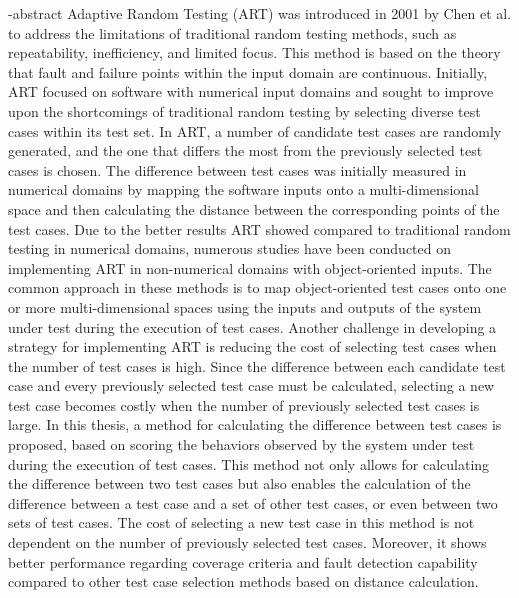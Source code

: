 
\en-abstract{
Adaptive Random Testing (ART) was introduced in 2001 by Chen et al. to address the limitations of traditional random testing methods, such as repeatability, inefficiency, and limited focus. This method is based on the theory that fault and failure points within the input domain are continuous. Initially, ART focused on software with numerical input domains and sought to improve upon the shortcomings of traditional random testing by selecting diverse test cases within its test set.
In ART, a number of candidate test cases are randomly generated, and the one that differs the most from the previously selected test cases is chosen. The difference between test cases was initially measured in numerical domains by mapping the software inputs onto a multi-dimensional space and then calculating the distance between the corresponding points of the test cases.
Due to the better results ART showed compared to traditional random testing in numerical domains, numerous studies have been conducted on implementing ART in non-numerical domains with object-oriented inputs. The common approach in these methods is to map object-oriented test cases onto one or more multi-dimensional spaces using the inputs and outputs of the system under test during the execution of test cases.
Another challenge in developing a strategy for implementing ART is reducing the cost of selecting test cases when the number of test cases is high. Since the difference between each candidate test case and every previously selected test case must be calculated, selecting a new test case becomes costly when the number of previously selected test cases is large.
\newline
In this thesis, a method for calculating the difference between test cases is proposed, based on scoring the behaviors observed by the system under test during the execution of test cases. This method not only allows for calculating the difference between two test cases but also enables the calculation of the difference between a test case and a set of other test cases, or even between two sets of test cases. The cost of selecting a new test case in this method is not dependent on the number of previously selected test cases. Moreover, it shows better performance regarding coverage criteria and fault detection capability compared to other test case selection methods based on distance calculation.
}
